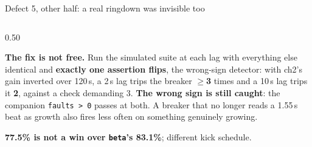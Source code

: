\documentclass[aspectratio=169]{beamer}
\begin{document}
\begin{frame}{Defect 5, other half: a real ringdown was invisible too}
\begin{columns}[T]
\begin{column}{0.50\textwidth}
      \vspace{1.5mm}
      \raggedright\scriptsize
      \textbf{The fix is not free.} Run the simulated suite at each lag with
      everything else identical and \textbf{exactly one assertion flips}, the
      wrong-sign detector: with ch2's gain inverted over 120\,s, a 2\,s lag
      trips the breaker \textbf{$\geq$3} times and a 10\,s lag trips it
      \textbf{2}, against a check demanding 3. \textbf{The wrong sign is still
      caught}: the companion \texttt{faults > 0} passes at both. A breaker that
      no longer reads a 1.55\,s beat as growth also fires less often on
      something genuinely growing.

      \vspace{1mm}
      \textbf{77.5\% is not a win over \texttt{beta}'s 83.1\%}; different kick
      schedule.
    \end{column}
  \end{columns}
\end{frame}
\end{document}
